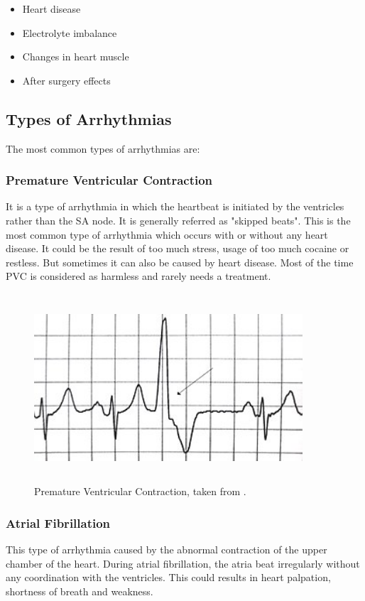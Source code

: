 \begin{itemize}
	\item Heart disease
	\item Electrolyte imbalance
	\item Changes in heart muscle
	\item After surgery effects
\end{itemize}

\subsection{Types of Arrhythmias}

The most common types of arrhythmias are:

\subsubsection{Premature Ventricular Contraction}
It is a type of arrhythmia in which the heartbeat is initiated by the ventricles rather than the SA node. It is generally referred as "skipped beats". This is the most common type of arrhythmia which occurs with or without any heart disease. It could be the result of too much stress, usage of too much cocaine or restless. But sometimes it can also be caused by heart disease. Most of the time PVC is considered as harmless and rarely needs a treatment.

\begin{figure}[htpb]
	\centering
	\includegraphics[width=10cm,height=7cm,keepaspectratio=true]{images/pvc}
	\caption{
		Premature Ventricular Contraction, taken from \cite{wiki:pvc}.
	}
	\label{fig:pvc}
\end{figure}

\subsubsection{Atrial Fibrillation}
This type of arrhythmia caused by the abnormal contraction of the upper chamber of the heart. During atrial fibrillation, the atria beat irregularly without any coordination with the ventricles. This could results in heart palpation, shortness of breath and weakness.


